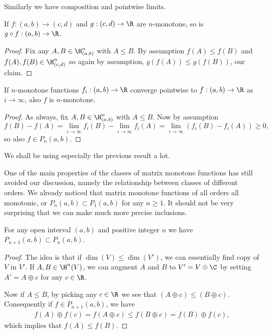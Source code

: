Similarly we have composition and pointwise limits.

\begin{prop}
	If $f : (a, b) \to (c, d)$ and $g : (c, d) \to \R$ are $n$-monotone, so is $g \circ f : (a, b) \to \R$.
\end{prop}
\begin{proof}
	Fix any $A, B \in \H^{n}_{(a, b)}$ with $A \leq B$. By assumption $f(A) \leq f(B)$ and $f(A), f(B) \in \H^{n}_{(c, d)}$ so again by assumption, $g(f(A)) \leq g(f(B))$, our claim.
\end{proof}

\begin{prop}
	If $n$-monotone functions $f_{i} : (a, b) \to \R$ converge pointwise to $f : (a, b) \to \R$ as $i \to \infty$, also $f$ is $n$-monotone.
\end{prop}
\begin{proof}
	As always, fix $A, B \in \H^{n}_{(a, b)}$ with $A \leq B$. Now by assumption
	\[
		f(B) - f(A) = \lim_{i \to \infty} f_{i}(B) - \lim_{i \to \infty} f_{i}(A) = \lim_{i \to \infty} \left(f_{i}(B) - f_{i}(A)\right) \geq 0,
	\]
	so also $f \in P_{n}(a, b)$.
\end{proof}

We shall be using especially the previous result a lot.

One of the main properties of the classes of matrix monotone functions has still avoided our discussion, namely the relationship between classes of different orders. We already noticed that matrix monotone functions of all orders all monotonic, or $P_{n}(a,b) \subset P_{1}(a, b)$ for any $n \geq 1$. It should not be very surprising that we can make much more precise inclusions.

\begin{prop}
	For any open interval $(a, b)$ and positive integer $n$ we have $P_{n + 1}(a, b) \subset P_{n}(a, b)$.
\end{prop}
\begin{proof}
	The idea is that if $\dim(V) \leq \dim(V')$, we can essentially find copy of $V$ in $V'$. If $A, B \in \H^{n}(V)$, we can augment $A$ and $B$ to $V' = V \oplus \C$ by setting $A' = A \oplus c$ for any $c \in \R$.

	Now if $A \leq B$, by picking any $c \in \R$ we see that $(A \oplus c) \leq (B \oplus c)$. Consequently if $f \in P_{n + 1}(a, b)$, we have
	\begin{align*}
		f(A) \oplus f(c) = f(A \oplus c) \leq f(B \oplus c) = f(B) \oplus f(c),
	\end{align*}
	which implies that $f(A) \leq f(B)$.
\end{proof}

